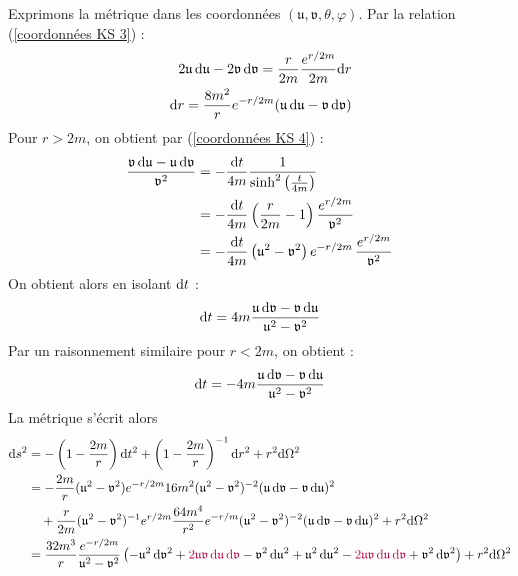 Exprimons la métrique dans les coordonnées $(\mathfrak{u},\mathfrak{v},\theta,\varphi)$. Par la relation (\ref{coordonnées KS 3}) :
\begin{align}
    2 \mathfrak{u} \,\mathrm{d} \mathfrak{u} - 2 \mathfrak{v} \,\mathrm{d} \mathfrak{v} = \frac{r}{2m} \frac{e^{r/2m}}{2m} \mathrm{d} r\\
    \label{coordonnées KS 5}
    \,\mathrm{d} r = \frac{8m^2}{r} e^{-r/2m} (\mathfrak{u} \,\mathrm{d} \mathfrak{u} - \mathfrak{v}\, \mathrm{d} \mathfrak{v})
\end{align}
Pour $r>2m$, on obtient par (\ref{coordonnées KS 4}) :
\begin{align}
    \frac{\mathfrak{v} \,\mathrm{d} \mathfrak{u} - \mathfrak{u} \, \mathrm{d} \mathfrak{v}}{\mathfrak{v}^2} &= - \frac{\mathrm{d} t}{4m} \frac{1}{\sinh^2 \left( \frac{t}{4m}\right)}\\
    & = - \frac{\mathrm{d} t}{4m} \left( \frac{r}{2m} - 1 \right) \frac{e^{r/2m}}{\mathfrak{v}^2}\\
    & = - \frac{\mathrm{d} t}{4m} \left( \mathfrak{u}^2 - \mathfrak{v}^2 \right) e^{-r/2m}\, \frac{e^{r/2m}}{\mathfrak{v}^2}
\end{align}
On obtient alors en isolant $\mathrm{d} t$ :
\begin{equation}
    \label{coordonnées KS 6}
    \mathrm{d} t = 4m \frac{\mathfrak{u} \, \mathrm{d} \mathfrak{v} - \mathfrak{v} \, \mathrm{d} \mathfrak{u}}{\mathfrak{u}^2 - \mathfrak{v}^2} 
\end{equation}
Par un raisonnement similaire pour $r<2m$, on obtient :
\begin{equation}
    \mathrm{d} t = - 4m \frac{\mathfrak{u} \, \mathrm{d} \mathfrak{v} - \mathfrak{v} \, \mathrm{d} \mathfrak{u}}{\mathfrak{u}^2 - \mathfrak{v}^2} 
\end{equation}
La métrique s'écrit alors
\begin{align*}
    \mathrm{d} s^2 &= - \left( 1 - \frac{2m}{r} \right) \mathrm{d} t^2 + \left( 1 - \frac{2m}{r} \right)^{-1} \mathrm{d} r^2 + r^2 \mathrm{d} \Omega^2 \\
    &= - \frac{2m}{r} (\mathfrak{u}^2 - \mathfrak{v}^2) e^{-r/2m} 16 m^2 (\mathfrak{u}^2 - \mathfrak{v}^2 )^{-2} (\mathfrak{u} \, \mathrm{d} \mathfrak{v} - \mathfrak{v} \, \mathrm{d} \mathfrak{u})^2 \\
    & \quad + \frac{r}{2m} (\mathfrak{u}^2 - \mathfrak{v}^2)^{-1} e^{r/2m} \frac{64m^4}{r^2} e^{-r/m} (\mathfrak{u}^2 - \mathfrak{v}^2 )^{-2} (\mathfrak{u} \, \mathrm{d} \mathfrak{v} - \mathfrak{v} \, \mathrm{d} \mathfrak{u})^2 + r^2 \mathrm{d} \Omega^2\\
    &= \frac{32 m^3}{r} \frac{e^{-r/2m}}{\mathfrak{u}^2 - \mathfrak{v}^2} \left( - \mathfrak{u}^2 \, \mathrm{d} \mathfrak{v}^2 + \textcolor{purple}{2 \mathfrak{u} \mathfrak{v} \, \mathrm{d} \mathfrak{u} \, \mathrm{d} \mathfrak{v}} - \mathfrak{v}^2 \, \mathrm{d} \mathfrak{u}^2 + \mathfrak{u}^2 \, \mathrm{d} \mathfrak{u}^2 - \textcolor{purple}{ 2 \mathfrak{u} \mathfrak{v} \, \mathrm{d} \mathfrak{u} \, \mathrm{d} \mathfrak{v}} + \mathfrak{v}^2 \, \mathrm{d} \mathfrak{v}^2 \right) + r^2 \mathrm{d} \Omega^2
\end{align*}
